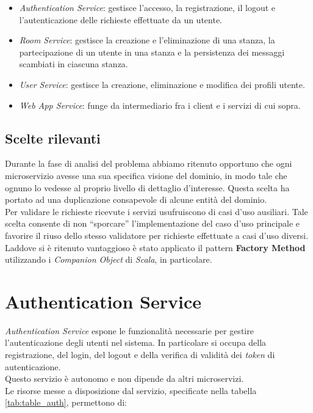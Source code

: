 \begin{itemize}
%
    \item \textit{Authentication Service}: gestisce l'accesso, la registrazione, il logout e l'autenticazione delle richieste effettuate da un utente.
%
    \item \textit{Room Service}: gestisce la creazione e l'eliminazione di una stanza, la partecipazione di un utente in una stanza e la persistenza dei messaggi scambiati in ciascuna stanza.
%
    \item \textit{User Service}: gestisce la creazione, eliminazione e modifica dei profili utente.
%
    \item \textit{Web App Service}: funge da intermediario fra i client e i servizi di cui sopra. 
%
\end{itemize}

\subsection{Scelte rilevanti}

Durante la fase di analisi del problema abbiamo ritenuto opportuno che ogni microservizio avesse una sua specifica visione del dominio, in modo tale che ognuno lo vedesse al proprio livello di dettaglio d'interesse. Questa scelta ha portato ad una duplicazione consapevole di alcune entità del dominio.
\\
Per validare le richieste ricevute i servizi usufruiscono di casi d'uso ausiliari. Tale scelta consente di non ``sporcare'' l'implementazione del caso d'uso principale e favorire il riuso dello stesso validatore per richieste effettuate a casi d'uso diversi.
\\
Laddove si è ritenuto vantaggioso è stato applicato il pattern \textbf{Factory Method} utilizzando i \textit{Companion Object} di \textit{Scala}, in particolare.

\section{Authentication Service}

\textit{Authentication Service} espone le funzionalità necessarie per gestire l'autenticazione degli utenti nel sistema. In particolare si occupa della registrazione, del login, del logout e della verifica di validità dei \textit{token} di autenticazione.\\
Questo servizio è autonomo e non dipende da altri microservizi.\\
Le risorse messe a disposizione dal servizio, specificate nella tabella \ref{tab:table_auth}, permettono di:

